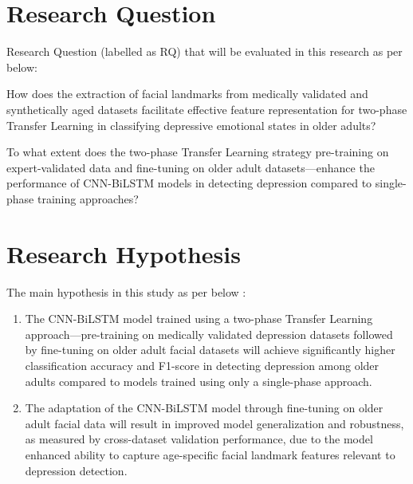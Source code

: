 

\section{Research Question}
Research Question (labelled as RQ) that will be evaluated in this research as per below:

\begin{description}[leftmargin=1.2cm, labelsep=0.2cm]
    \item[RQ1 :] How does the extraction of facial landmarks from medically validated and synthetically aged datasets facilitate effective feature representation for two-phase Transfer Learning in classifying depressive emotional states in older adults?
    
    \item[RQ2 :] To what extent does the two-phase Transfer Learning strategy pre-training on expert-validated data and fine-tuning on older adult datasets—enhance the performance of CNN-BiLSTM models in detecting depression compared to single-phase training approaches?
\end{description}

\section{Research Hypothesis}
The main hypothesis in this study as per below :

\begin{enumerate}[label=(\arabic*), leftmargin=1.2cm]
    \item The CNN-BiLSTM model trained using a two-phase Transfer Learning approach—pre-training on medically validated depression datasets followed by fine-tuning on older adult facial datasets will achieve significantly higher classification accuracy and F1-score in detecting depression among older adults compared to models trained using only a single-phase approach.
    
    \item The adaptation of the CNN-BiLSTM model through fine-tuning on older adult facial data will result in improved model generalization and robustness, as measured by cross-dataset validation performance, due to the model enhanced ability to capture age-specific facial landmark features relevant to depression detection.
\end{enumerate}

